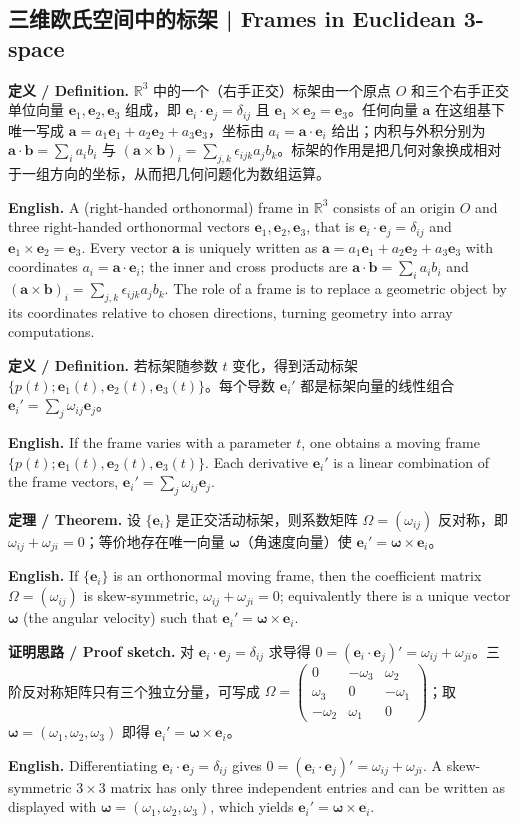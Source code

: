 \documentclass[UTF8,11pt,a4paper]{ctexart}
\newcommand{\EN}[1]{\par\noindent \textbf{English.} #1\par}
\newcommand{\DEF}[2]{\par\noindent\textbf{定义 / Definition.} #1\par\EN{#2}\par\smallskip}
\newcommand{\THM}[2]{\par\noindent\textbf{定理 / Theorem.} #1\par\EN{#2}\par\smallskip}
\newcommand{\PROOF}[2]{\par\noindent\textbf{证明思路 / Proof sketch.} #1\par\EN{#2}\par\smallskip}
\newcommand{\RR}{\mathbb{R}}
\newcommand{\be}{\mathbf{e}}
\newcommand{\ba}{\mathbf{a}}
\newcommand{\bb}{\mathbf{b}}
\newcommand{\bomega}{\boldsymbol{\omega}}
\begin{document}
\subsection{三维欧氏空间中的标架 | Frames in Euclidean 3-space}
\DEF{$\RR^3$ 中的一个（右手正交）标架由一个原点 $O$ 和三个右手正交单位向量 $\be_1,\be_2,\be_3$ 组成，即 $\be_i\cdot\be_j=\delta_{ij}$ 且 $\be_1\times\be_2=\be_3$。任何向量 $\ba$ 在这组基下唯一写成 $\ba=a_1\be_1+a_2\be_2+a_3\be_3$，坐标由 $a_i=\ba\cdot\be_i$ 给出；内积与外积分别为 $\ba\cdot\bb=\sum_i a_ib_i$ 与 $(\ba\times\bb)_i=\sum_{j,k}\epsilon_{ijk}a_jb_k$。标架的作用是把几何对象换成相对于一组方向的坐标，从而把几何问题化为数组运算。}{A (right-handed orthonormal) frame in $\RR^3$ consists of an origin $O$ and three right-handed orthonormal vectors $\be_1,\be_2,\be_3$, that is $\be_i\cdot\be_j=\delta_{ij}$ and $\be_1\times\be_2=\be_3$. Every vector $\ba$ is uniquely written as $\ba=a_1\be_1+a_2\be_2+a_3\be_3$ with coordinates $a_i=\ba\cdot\be_i$; the inner and cross products are $\ba\cdot\bb=\sum_i a_ib_i$ and $(\ba\times\bb)_i=\sum_{j,k}\epsilon_{ijk}a_jb_k$. The role of a frame is to replace a geometric object by its coordinates relative to chosen directions, turning geometry into array computations.}
\DEF{若标架随参数 $t$ 变化，得到活动标架 $\{p(t);\be_1(t),\be_2(t),\be_3(t)\}$。每个导数 $\be_i'$ 都是标架向量的线性组合 $\be_i'=\sum_j\omega_{ij}\be_j$。}{If the frame varies with a parameter $t$, one obtains a moving frame $\{p(t);\be_1(t),\be_2(t),\be_3(t)\}$. Each derivative $\be_i'$ is a linear combination of the frame vectors, $\be_i'=\sum_j\omega_{ij}\be_j$.}
\THM{设 $\{\be_i\}$ 是正交活动标架，则系数矩阵 $\Omega=(\omega_{ij})$ 反对称，即 $\omega_{ij}+\omega_{ji}=0$；等价地存在唯一向量 $\bomega$（角速度向量）使 $\be_i'=\bomega\times\be_i$。}{If $\{\be_i\}$ is an orthonormal moving frame, then the coefficient matrix $\Omega=(\omega_{ij})$ is skew-symmetric, $\omega_{ij}+\omega_{ji}=0$; equivalently there is a unique vector $\bomega$ (the angular velocity) such that $\be_i'=\bomega\times\be_i$.}
\PROOF{对 $\be_i\cdot\be_j=\delta_{ij}$ 求导得 $0=(\be_i\cdot\be_j)'=\omega_{ij}+\omega_{ji}$。三阶反对称矩阵只有三个独立分量，可写成 $\Omega=\begin{pmatrix}0&-\omega_3&\omega_2\\ \omega_3&0&-\omega_1\\ -\omega_2&\omega_1&0\end{pmatrix}$；取 $\bomega=(\omega_1,\omega_2,\omega_3)$ 即得 $\be_i'=\bomega\times\be_i$。}{Differentiating $\be_i\cdot\be_j=\delta_{ij}$ gives $0=(\be_i\cdot\be_j)'=\omega_{ij}+\omega_{ji}$. A skew-symmetric $3\times3$ matrix has only three independent entries and can be written as displayed with $\bomega=(\omega_1,\omega_2,\omega_3)$, which yields $\be_i'=\bomega\times\be_i$.}
\end{document}
